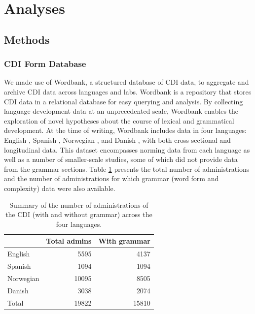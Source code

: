 \documentclass[10pt,letterpaper]{article}
\begin{document}
\section{Analyses}

\subsection{Methods}

\subsubsection{CDI Form Database}

We made use of Wordbank, a structured database of CDI data, to aggregate and archive CDI data across languages and labs. Wordbank is a repository that stores CDI data in a relational database for easy querying and analysis. By collecting language development data at an unprecedented scale, Wordbank enables the exploration of novel hypotheses about the course of lexical and grammatical development. At the time of writing, Wordbank includes data in four languages: English \cite{fenson2007}, Spanish \cite{jackson1993}, Norwegian \cite{simonsen2014}, and Danish \cite{bleses2008}, with both cross-sectional and longitudinal data. This dataset encompasses norming data from each language as well as a number of smaller-scale studies, some of which did not provide data from the grammar sections. Table \ref{table:num} presents the total number of administrations and the number of administrations for which grammar (word form and complexity) data were also available.

\begin{table}[t]
\begin{center}
\begin{tabular}{lrr}
\hline
& Total admins & With grammar\\ 
\hline
English & 5595 & 4137\\ 
Spanish & 1094 & 1094\\ 
Norwegian & 10095 & 8505\\ 
Danish & 3038 & 2074\\ 
\hline
Total & 19822 & 15810 \\
\hline
\end{tabular}
\end{center}
\caption{\label{table:num} Summary of the number of administrations of the CDI (with and without grammar) across the four languages.}
\end{table}
\end{document}

